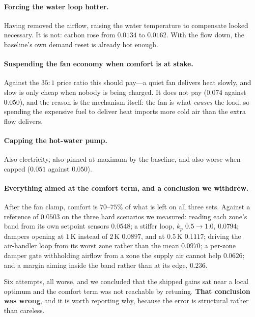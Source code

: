 \documentclass[10pt]{article}
\begin{document}
\paragraph{Forcing the water loop hotter.} Having removed the airflow, raising
the water temperature to compensate looked necessary. It is not: carbon rose
from $0.0134$ to $0.0162$. With the flow down, the baseline's own demand reset
is already hot enough.

\paragraph{Suspending the fan economy when comfort is at stake.} Against the
$35{:}1$ price ratio this should pay---a quiet fan delivers heat slowly, and
slow is only cheap when nobody is being charged. It does not pay ($0.074$
against $0.050$), and the reason is the mechanism itself: the fan is what
\emph{causes} the load, so spending the expensive fuel to deliver heat imports
more cold air than the extra flow delivers.

\paragraph{Capping the hot-water pump.} Also electricity, also pinned at
maximum by the baseline, and also worse when capped ($0.051$ against $0.050$).

\paragraph{Everything aimed at the comfort term, and a conclusion we withdrew.}
After the fan clamp, comfort is $70$--$75\%$ of what is left on all three sets.
Against a reference of $0.0503$ on the three hard scenarios we measured:
reading each zone's band from its own setpoint sensors $0.0548$; a stiffer
loop, $k_p$ $0.5\!\to\!1.0$, $0.0794$; dampers opening at $1$\,K instead of
$2$\,K $0.0897$, and at $0.5$\,K $0.1117$; driving the air-handler loop from
its worst zone rather than the mean $0.0970$; a per-zone damper gate
withholding airflow from a zone the supply air cannot help $0.0626$; and a
margin aiming inside the band rather than at its edge, $0.236$.

Six attempts, all worse, and we concluded that the shipped gains sat near a
local optimum and the comfort term was not reachable by retuning.
\textbf{That conclusion was wrong}, and it is worth reporting why, because the
error is structural rather than careless.
\end{document}
